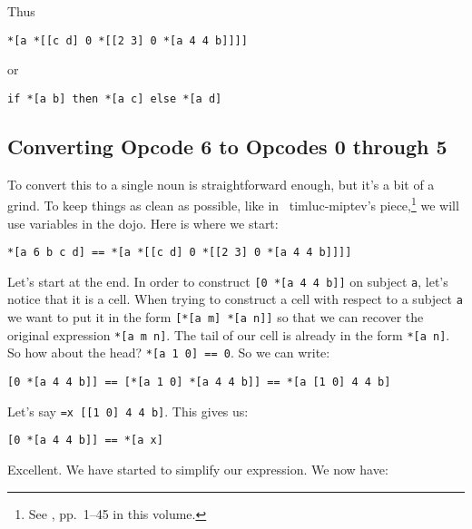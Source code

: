 \documentclass[twoside]{article}
\begin{document}
Thus

\begin{lstlisting}[style=listingblock]
*[a *[[c d] 0 *[[2 3] 0 *[a 4 4 b]]]]
\end{lstlisting}

\noindent
or

\begin{lstlisting}[style=listingblock]
if *[a b] then *[a c] else *[a d]
\end{lstlisting}

\subsection*{Converting Opcode 6 to Opcodes 0 through 5}

To convert this to a single noun is straightforward enough, but it's a bit of a grind. To keep things as clean as possible, like in ~timluc-miptev's piece,\footnote{See , pp.~1--45 in this volume.} we will use variables in the dojo. Here is where we start:

\begin{lstlisting}[style=listingcode]
*[a 6 b c d] == *[a *[[c d] 0 *[[2 3] 0 *[a 4 4 b]]]]
\end{lstlisting}

Let's start at the end. In order to construct \lstinline[style=inlinecode]{[0 *[a 4 4 b]]} on subject \lstinline[style=inlinecode]{a}, let's notice that it is a cell. When trying to construct a cell with respect to a subject \lstinline[style=inlinecode]{a} we want to put it in the form \lstinline[style=inlinecode]{[*[a m] *[a n]]} so that we can recover the original expression \lstinline[style=inlinecode]{*[a m n]}. The tail of our cell is already in the form \lstinline[style=inlinecode]{*[a n]}. So how about the head? \lstinline[style=inlinecode]{*[a 1 0] == 0}. So we can write:

\begin{lstlisting}[style=listingblock]
[0 *[a 4 4 b]] == [*[a 1 0] *[a 4 4 b]] == *[a [1 0] 4 4 b]
\end{lstlisting}

\noindent
Let's say \lstinline[style=inlinecode]{=x [[1 0] 4 4 b]}. This gives us:

\begin{lstlisting}[style=listingblock]
[0 *[a 4 4 b]] == *[a x]
\end{lstlisting}

\noindent
Excellent. We have started to simplify our expression. We now have:
\end{document}

